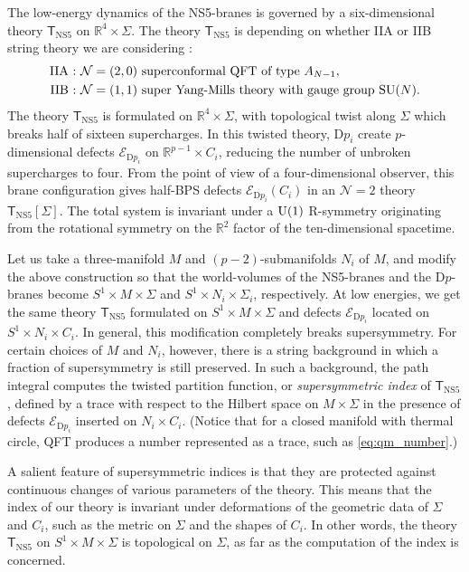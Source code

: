 The low-energy dynamics of the NS5-branes is governed by a six-dimensional
theory $\mathsf{T}_{\mathrm{NS5}}$ on $\mathbb{R}^{4}\times\Sigma$.
The theory $\mathsf{T}_{\mathrm{NS5}}$ is depending on whether IIA
or IIB string theory we are considering \cite{Callan:1991ky}:
\begin{align*}
  \textrm{IIA : }  &  \mathcal{N} = (2,0)  \text{ superconformal QFT of type } A_{N-1},  \\
  \textrm{IIB : }  &  \mathcal{N} = (1,1)  \text{ super Yang-Mills theory with gauge group } \mathrm{SU}(N).
\end{align*}
The theory $\mathsf{T}_{\mathrm{NS5}}$ is formulated on $\mathbb{R}^{4}\times\Sigma$,
with topological twist along $\Sigma$ which breaks half of sixteen
supercharges. In this twisted theory, D$p_{i}$ create $p$-dimensional
defects $\mathcal{E}_{\mathrm{D}p_{i}}$ on $\mathbb{R}^{p-1}\times C_{i}$,
reducing the number of unbroken supercharges to four. From the point
of view of a four-dimensional observer, this brane configuration gives
half-BPS defects $\mathcal{E}_{\mathrm{D}p_{i}}(C_{i})$
in an $\mathcal{N}=2$ theory $\mathsf{T}_{\mathrm{NS5}}[\Sigma]$.
The total system is invariant under a $\mathrm{U}(1)$ R-symmetry originating
from the rotational symmetry on the $\mathbb{R}^{2}$ factor of the
ten-dimensional spacetime.

Let us take a three-manifold $M$ and $(p-2)$-submanifolds $N_{i}$
of $M$, and modify the above construction so that the world-volumes
of the NS5-branes and the D$p$-branes become $S^{1}\times M\times\Sigma$
and $S^{1}\times N_{i}\times\Sigma_{i}$, respectively. At low energies,
we get the same theory $\mathsf{T}_{\mathrm{NS5}}$ formulated on
$S^{1}\times M\times\Sigma$ and defects $\mathcal{E}_{\mathrm{D}p_{i}}$
located on $S^{1}\times N_{i}\times C_{i}$. In general, this modification
completely breaks supersymmetry. For certain choices of $M$ and $N_{i}$,
however, there is a string background in which a fraction of supersymmetry
is still preserved. In such a background, the path integral computes
the twisted partition function, or \emph{supersymmetric index} of $\mathsf{T}_{\mathrm{NS5}}$,
defined by a trace with respect to the Hilbert space on $M\times\Sigma$ in the presence
of defects $\mathcal{E}_{\mathrm{D}p_{i}}$ inserted on $N_{i}\times C_{i}$.
(Notice that for a closed manifold with thermal circle, QFT produces a number represented as a trace,
such as \eqref{eq:qm_number}.)

A salient feature of supersymmetric indices is that they are protected
against continuous changes of various parameters of the theory. This
means that the index of our theory is invariant under deformations
of the geometric data of $\Sigma$ and $C_{i}$, such as the metric
on $\Sigma$ and the shapes of $C_{i}$. In other words, the theory
$\mathsf{T}_{\mathrm{NS5}}$ on $S^{1}\times M\times\Sigma$ is topological
on $\Sigma$, as far as the computation of the index is concerned.

